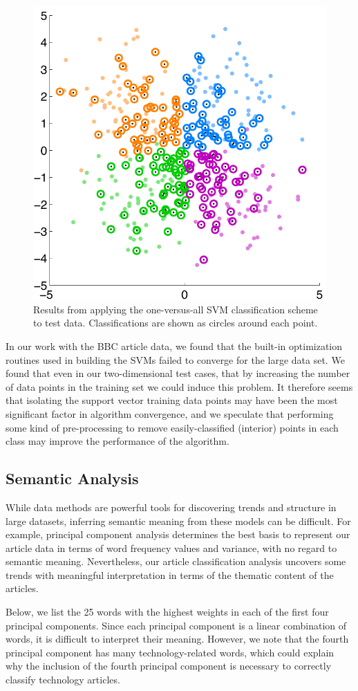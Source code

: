 \documentclass[12pt]{article}
\begin{document}
\begin{figure}[H]
\centering
\includegraphics[width=.48\textwidth]{figures/svm_classification}
\caption{Results from applying the one-versus-all SVM classification scheme to test data. Classifications are shown as circles around each point.}
\label{fig:svm_classify}
\end{figure}

In our work with the BBC article data, we found that the built-in optimization routines used in building the SVMs failed to converge for the large data set. We found that even in our two-dimensional test cases, that by increasing the number of data points in the training set we could induce this problem. It therefore seems that isolating the support vector training data points may have been the most significant factor in algorithm convergence, and we speculate that performing some kind of pre-processing to remove easily-classified (interior) points in each class may improve the performance of the algorithm.

\subsection{Semantic Analysis}

While data methods are powerful tools for discovering trends and structure in large datasets, inferring semantic meaning from these models can be difficult. For example, principal component analysis determines the best basis to represent our article data in terms of word frequency values and variance, with no regard to semantic meaning. Nevertheless, our article classification analysis uncovers some trends with meaningful interpretation in terms of the thematic content of the articles.

Below, we list the 25 words with the highest weights in each of the first four principal components. Since each principal component is a linear combination of words, it is difficult to interpret their meaning. However, we note that the fourth principal
component has many technology-related words, which could explain why the inclusion of the fourth principal component is necessary to correctly classify technology articles.
\end{document}
